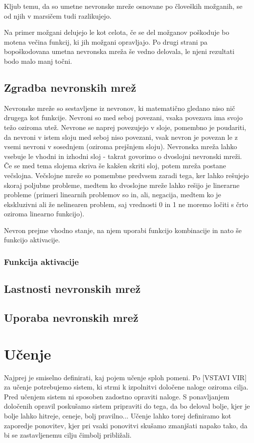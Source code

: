 \documentclass[mat1]{fmfdelo}
\begin{document}
Kljub temu, da so umetne nevronske mreže osnovane po človeških možganih, se od njih v marsičem tudi razlikujejo.

 Na primer možgani delujejo le kot celota, če se del možganov poškoduje bo motena večina funkcij, ki jih možgani opravljajo. Po drugi strani pa bopoškodovana umetna nevronska mreža še vedno delovala, le njeni rezultati bodo malo manj točni. 

\subsection{Zgradba nevronskih mrež}
Nevronske mreže so sestavljene iz nevronov, ki matematično gledano niso nič drugega kot funkcije. Nevroni so med seboj povezani, vsaka povezava ima svojo težo oziroma utež. Nevrone se naprej povezujejo v sloje, pomembno je poudariti, da nevroni v istem sloju med seboj niso povezani, vsak nevron je povezan le z vsemi nevroni v sosednjem (oziroma prejšnjem sloju). Nevronska mreža lahko vsebuje le vhodni in izhodni sloj - takrat govorimo o dvoslojni nevronski mreži. Če se med tema slojema skriva še kakšen skriti sloj, potem mreža postane večslojna. Večslojne mreže so pomembne predvsem zaradi tega, ker lahko rešujejo skoraj poljubne probleme, medtem ko dvoslojne mreže lahko rešijo je linerarne probleme (primeri linearnih problemov so in, ali, negacija, medtem ko je ekskluzivni ali že nelinearen problem, saj vrednosti 0 in 1 ne moremo ločiti s črto oziroma linearno funkcijo).

Nevron prejme vhodno stanje, na njem uporabi funkcijo kombinacije in nato še funkcijo aktivacije.

\subsubsection{Funkcija aktivacije}




\subsection{Lastnosti nevronskih mrež}

\subsection{Uporaba nevronskih mrež}

\section{Učenje}
Najprej je smiselno definirati, kaj pojem učenje sploh pomeni. Po [VSTAVI VIR] za učenje potrebujemo sistem, ki strmi k izpolnitvi določene naloge oziroma cilja. Pred učenjem sistem ni sposoben zadostno opraviti naloge. S ponavljanjem določenih opravil poskušamo sistem pripraviti do tega, da bo deloval bolje, kjer je bolje lahko hitreje, ceneje, bolj pravilno... Učenje lahko torej definiramo kot zaporedje ponovitev, kjer pri vsaki ponovitvi skušamo zmanjšati napako tako, da bi se zastavljenemu cilju čimbolj približali. 
\end{document}
